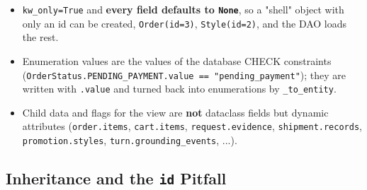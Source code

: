 \begin{itemize}
\tightlist
\item
  \texttt{kw\_\allowbreak{}only=\allowbreak{}True} and \textbf{every field defaults to
  \texttt{None}}, so a "shell" object with only an id can be created,
  \texttt{Order(\allowbreak{}id=\allowbreak{}3)}, \texttt{Style(\allowbreak{}id=\allowbreak{}2)}, and the DAO loads the
  rest.
\item
  Enumeration values are the values of the database CHECK constraints
  (\texttt{OrderStatus.\allowbreak{}PENDING\_\allowbreak{}PAYMENT.\allowbreak{}value =\allowbreak{}=\allowbreak{} "pending\_\allowbreak{}payment"});
  they are written with \texttt{.\allowbreak{}value} and turned back into
  enumerations by \texttt{\_\allowbreak{}to\_\allowbreak{}entity}.
\item
  Child data and flags for the view are \textbf{not} dataclass fields
  but dynamic attributes (\texttt{order.\allowbreak{}items}, \texttt{cart.\allowbreak{}items},
  \texttt{request.\allowbreak{}evidence}, \texttt{shipment.\allowbreak{}records},
  \texttt{promotion.\allowbreak{}styles}, \texttt{turn.\allowbreak{}grounding\_\allowbreak{}events}, ...).
\end{itemize}

\hypertarget{inheritance-and-the-id-pitfall}{%
\subsection{\texorpdfstring{Inheritance and the \texttt{id}
Pitfall}{Inheritance and the id Pitfall}}\label{inheritance-and-the-id-pitfall}}

